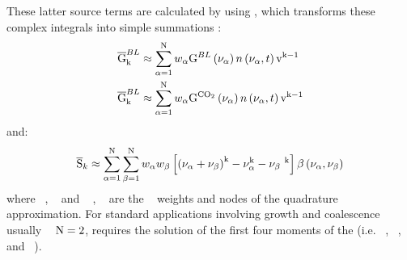 These latter source terms are calculated by using {\QuadratureMethodOfMoments}, which transforms these complex integrals into simple summations \cite{marchisio_and_fox_2013}:
\begin{align}
    \overline{\mathrm{G}}_{\mathrm{k}}^{BL} &\approx \sum_{\alpha=1}^{\mathrm{N}} w_{\alpha}
                                                 {\mathrm{G}^{BL}}\left( \nu_{\alpha} \right)
                                                 n\left({\nu_{\alpha}, t}\right)
                                                 \mathrm{v}^{\mathrm{k}-1}                                     
   \\
    \overline{\mathrm{G}}_{\mathrm{k}}^{BL} &\approx \sum_{\alpha=1}^{\mathrm{N}} w_{\alpha}
                                                 {\mathrm{G}^{\mathrm{C}\mathrm{O}_2}}\left( \nu_{\alpha} \right)
                                                 n\left({\nu_{\alpha}, t}\right)
                                                 \mathrm{v}^{\mathrm{k}-1}
\end{align}
and:
\begin{equation}
    \overline{\mathrm{S}}_k \approx 
        \sum_{\alpha=1}^{\mathrm{N}}
            \sum_{\beta=1}^{\mathrm{N}} w_{\alpha} w_{\beta}
                \left[
                     \left(
                           \nu_{\alpha} + \nu_{\beta}
                     \right)^{\mathrm{k}} - \nu_{\alpha}^{\mathrm{k}} - \nu_{\beta}\ ^{\mathrm{k}}
                \right]
                {\ensuremath{\beta}}\left( \nu_{\alpha} , \nu_{\beta} \right)
\end{equation}
where {~\QuadratureWeightOne}, {~\QuadratureWeightTwo} and {~\QuadratureNodeOne} , {~\QuadratureNodeTwo} are the {~\NumberOfQuadratureNodes} weights and nodes of the quadrature approximation. 
\newcommand{ \paper}{ \ensuremath{\NumberOfQuadratureNodes=2}}
For standard applications involving growth and coalescence usually {~\paper}, requires the solution of the first four moments of the {\BubbleSizeDistribution} (i.e. {~\MomentOfOrderZero}, {~\MomentOfOrderOne}, {~\MomentOfOrderTwo} and {~\MomentOfOrderThree}).

%
